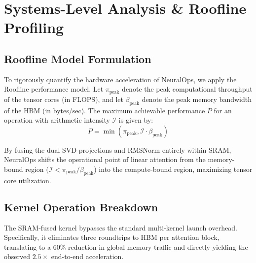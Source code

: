\section{Systems-Level Analysis \& Roofline Profiling}
\label{sec:systems}

\subsection{Roofline Model Formulation}
To rigorously quantify the hardware acceleration of NeuralOps, we apply the Roofline performance model. Let $\pi_{\text{peak}}$ denote the peak computational throughput of the tensor cores (in FLOPS), and let $\beta_{\text{peak}}$ denote the peak memory bandwidth of the HBM (in bytes/sec). The maximum achievable performance $P$ for an operation with arithmetic intensity $\mathcal{I}$ is given by:
\begin{equation}
P = \min(\pi_{\text{peak}}, \mathcal{I} \cdot \beta_{\text{peak}})
\end{equation}

By fusing the dual SVD projections and RMSNorm entirely within SRAM, NeuralOps shifts the operational point of linear attention from the memory-bound region ($\mathcal{I} < \pi_{\text{peak}} / \beta_{\text{peak}}$) into the compute-bound region, maximizing tensor core utilization.

\subsection{Kernel Operation Breakdown}
The SRAM-fused kernel bypasses the standard multi-kernel launch overhead. Specifically, it eliminates three roundtrips to HBM per attention block, translating to a $60\%$ reduction in global memory traffic and directly yielding the observed $2.5\times$ end-to-end acceleration.
